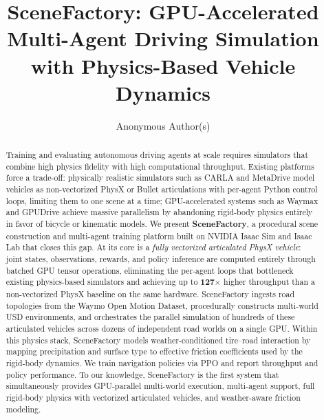 \documentclass{article}
\title{SceneFactory: GPU-Accelerated Multi-Agent Driving Simulation\\
with Physics-Based Vehicle Dynamics}
\author{%
  Anonymous Author(s)
}
\begin{document}
\maketitle

\begin{abstract}
Training and evaluating autonomous driving agents at scale requires simulators that combine high physics fidelity with high computational throughput.
Existing platforms force a trade-off: physically realistic simulators such as CARLA and MetaDrive model vehicles as non-vectorized PhysX or Bullet articulations with per-agent Python control loops, limiting them to one scene at a time; GPU-accelerated systems such as Waymax and GPUDrive achieve massive parallelism by abandoning rigid-body physics entirely in favor of bicycle or kinematic models.
We present \textbf{SceneFactory}, a procedural scene construction and multi-agent training platform built on NVIDIA Isaac Sim and Isaac Lab that closes this gap.
At its core is a \emph{fully vectorized articulated PhysX vehicle}: joint states, observations, rewards, and policy inference are computed entirely through batched GPU tensor operations, eliminating the per-agent loops that bottleneck existing physics-based simulators and achieving up to \textbf{127$\times$} higher throughput than a non-vectorized PhysX baseline on the same hardware.
SceneFactory ingests road topologies from the Waymo Open Motion Dataset, procedurally constructs multi-world USD environments, and orchestrates the parallel simulation of hundreds of these articulated vehicles across dozens of independent road worlds on a single GPU.
Within this physics stack, SceneFactory models weather-conditioned tire--road interaction by mapping precipitation and surface type to effective friction coefficients used by the rigid-body dynamics.
We train navigation policies via PPO and report throughput and policy performance.
To our knowledge, SceneFactory is the first system that simultaneously provides GPU-parallel multi-world execution, multi-agent support, full rigid-body physics with vectorized articulated vehicles, and weather-aware friction modeling.
\end{abstract}






\end{document}
